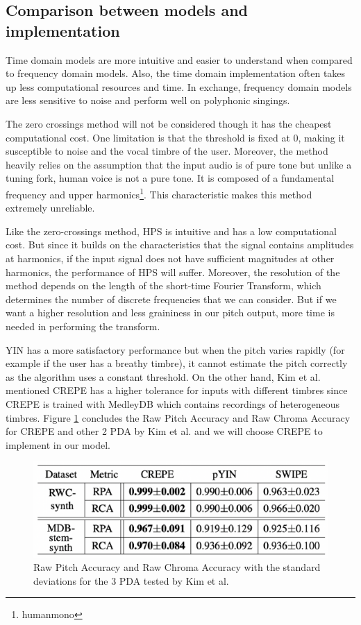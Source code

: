 \subsection{Comparison between models and implementation}
Time domain models are more intuitive and easier to understand when compared to frequency domain models.
Also, the time domain implementation often takes up less computational resources and time.
In exchange, frequency domain models are less sensitive to noise and perform well on polyphonic singings.

The zero crossings method will not be considered though it has the cheapest computational cost. One limitation is that
the threshold is fixed at 0, making it susceptible to noise and the vocal timbre of the user. Moreover, the method heavily relies on
the assumption that the input audio is of pure tone but unlike a tuning fork, human voice is not a pure tone. It is 
composed of a fundamental frequency and upper harmonics\footnote{humanmono}.  This characteristic makes this method extremely
unreliable.

Like the zero-crossings method, HPS is intuitive and has a low computational cost. But since it builds on the characteristics 
that the signal contains amplitudes at harmonics, if the input signal does not have sufficient magnitudes at other harmonics, the 
performance of HPS will suffer. Moreover, the resolution of the method depends on the length of the short-time Fourier Transform, which
determines the number of discrete frequencies that we can consider. But if we want a higher resolution and less graininess in our 
pitch output, more time is needed in performing the transform.

YIN has a more satisfactory performance but when the pitch varies rapidly (for example if the user has a breathy timbre), it cannot 
estimate the pitch correctly as the algorithm uses a constant threshold. On the other hand, Kim et al. mentioned CREPE has a higher 
tolerance for inputs with different timbres since CREPE is trained with MedleyDB which contains recordings of heterogeneous timbres. Figure 
\cref{CREPEperf} concludes the Raw Pitch Accuracy and Raw Chroma Accuracy for CREPE and other 2 PDA by Kim et al. and we will choose CREPE 
to implement in our model.

\begin{figure}[h]
	\centering
	\includegraphics[width=0.8\columnwidth]{Figures/CREPEperf.png}
	\caption{Raw Pitch Accuracy and Raw Chroma Accuracy with the standard deviations for the 3 PDA tested by Kim et al.}
	\label{CREPEperf}
\end{figure}

